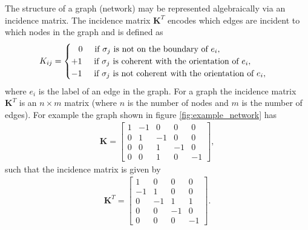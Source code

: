\documentclass[12pt]{article}
\begin{document}
The structure of a graph (network) may be represented algebraically via an incidence matrix. The incidence matrix $\mathbf{K}^T$ encodes which edges are incident to which nodes in the graph and is defined as 
\begin{align}
K_{ij}=
\begin{cases}
\hspace{0.3cm} 0 \hspace{0.5cm} \text{if } \sigma_j \text{ is not on the boundary of } e_i, \\
+1 \hspace{0.5cm} \text{if } \sigma_j \text{ is coherent with the orientation of } e_i,\\
-1 \hspace{0.5cm} \text{if } \sigma_j \text{ is not coherent with the orientation of } e_i,
\end{cases}
\end{align}
where $e_i$ is the label of an edge in the graph. For a graph the incidence matrix $\mathbf{K}^T$ is an $n \times m$ matrix (where $n$ is the number of nodes and $m$ is the number of edges). For example the graph shown in figure \ref{fig:example_network} has 
\begin{align*}
\mathbf{K} = \begin{bmatrix}
1 & -1 & 0 & 0 & 0 \\
0 & 1 & -1 & 0 & 0 \\
0 & 0 & 1 & -1 & 0 \\
0 & 0 & 1 & 0 & -1 
\end{bmatrix},
\end{align*}
such that the incidence matrix is given by 
\begin{align*}
\mathbf{K}^T = \begin{bmatrix}
1 & 0 & 0 & 0 \\ 
-1 & 1 & 0 & 0 \\
0 & -1 & 1 & 1 \\
0 & 0 & -1 & 0 \\
0 & 0 & 0 & -1
\end{bmatrix}.
\end{align*}
\end{document}
